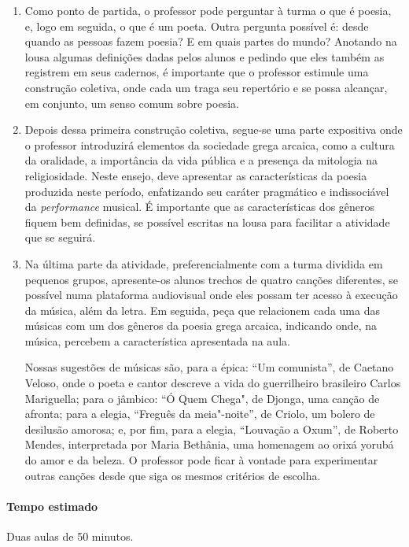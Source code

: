 \documentclass[12pt]{extarticle}
\begin{document}
\begin{enumerate}
\item
Como ponto de partida, o professor pode perguntar à turma o que é poesia,
e, logo em seguida, o que é um poeta. Outra pergunta possível é: desde quando
as pessoas fazem poesia? E em quais partes do mundo? 
Anotando na lousa algumas definições dadas pelos alunos e pedindo que eles
também as registrem em seus cadernos, é importante que o professor estimule 
uma construção coletiva, onde cada um traga seu repertório e se possa alcançar,
em conjunto, um senso comum sobre poesia.

\item
Depois dessa primeira construção coletiva, segue-se uma parte expositiva onde 
o professor introduzirá elementos da sociedade grega arcaica, como a cultura
da oralidade, a importância da vida pública e a presença da mitologia na religiosidade. 
Neste ensejo, deve apresentar as características da poesia produzida neste período, 
enfatizando seu caráter pragmático e indissociável da \textit{performance} musical.
É importante que as características dos gêneros fiquem bem definidas, se possível
escritas na lousa para facilitar a atividade que se seguirá. 

\item
Na última parte da atividade, preferencialmente com a turma dividida em pequenos 
grupos, apresente-os alunos trechos de quatro canções diferentes, se possível numa 
plataforma audiovisual onde eles possam ter acesso à execução da música, além da letra. 
Em seguida, peça que relacionem cada uma das músicas com um dos gêneros da poesia grega 
arcaica, indicando onde, na música, percebem a característica apresentada na aula. 

Nossas sugestões de músicas são, para a épica: ``Um comunista'', de Caetano Veloso, 
onde o poeta e cantor descreve a vida do guerrilheiro brasileiro Carlos Mariguella;
para o jâmbico: ``Ó Quem Chega", de Djonga, uma canção de afronta; para a elegia, 
``Freguês da meia"-noite'', de Criolo, um bolero de desilusão amorosa; e, por fim,
para a elegia, ``Louvação a Oxum'', de Roberto Mendes, interpretada por Maria Bethânia,
uma homenagem ao orixá yorubá do amor e da beleza.
O professor pode ficar à vontade para experimentar outras canções desde que siga os
mesmos critérios de escolha.  

\end{enumerate}

\paragraph{Tempo estimado} Duas aulas de 50 minutos. 
\end{document}
